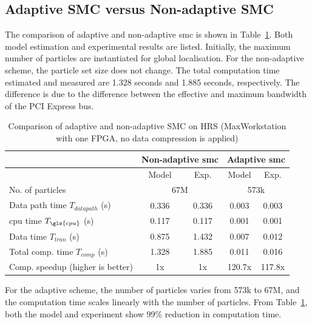 \subsection{Adaptive SMC versus Non-adaptive SMC}
The comparison of adaptive and non-adaptive \gls{smc} is shown in Table~\ref{tab:smc}.
Both model estimation and experimental results are listed.
Initially, the maximum number of particles are instantiated for global localisation.
For the non-adaptive scheme, the particle set size does not change.
The total computation time estimated and measured are 1.328 seconds and 1.885 seconds, respectively.
The difference is due to the difference between the effective and maximum bandwidth of the PCI Express bus.

\begin{table}[ht]
	\centering
	\setlength{\tabcolsep}{5pt}
	\begin{spacing}{1.0}
	\caption[Comparison of adaptive and non-adaptive SMC on HRS]{Comparison of adaptive and non-adaptive SMC on HRS (MaxWorkstation with one FPGA, no data compression is applied)\label{tab:smc}}{
	\smallskip
		\begin{tabular}{l || c c | c c}
			\hline
			 \multirow{2}{*}{}  & \multicolumn{2}{|c|}{Non-adaptive \gls{smc}} & \multicolumn{2}{|c|}{Adaptive \gls{smc}} \\
			\hline
			  & Model & Exp. & Model & Exp. \\
			\hline
			\hline
			 No. of particles & \multicolumn{2}{|c|}{67M} & \multicolumn{2}{|c|}{573k} \\
			\hline
			 Data path time $T_{datapath}$ (s) 		& 0.336 & 0.336 & 0.003 & 0.003 \\
			 \gls{cpu} time $T_{\gls{cpu}}$ (s) 				& 0.117 & 0.117 & 0.001 & 0.001 \\
			 Data time $T_{tran}$ (s) 				& 0.875 & 1.432 & 0.007 & 0.012 \\
			 Total comp. time $T_{comp}$ (s)			& 1.328 & 1.885 & 0.011	& 0.016 \\
			\hline
			 Comp. speedup (higher is better)		& 1x	& 1x	& 120.7x	& 117.8x \\
			\hline
		\end{tabular}
	}
	\end{spacing}
\end{table}

For the adaptive scheme, the number of particles varies from 573k to 67M, and the computation time scales linearly with the number of particles.
From Table~\ref{tab:smc}, both the model and experiment show 99\% reduction in computation time.

